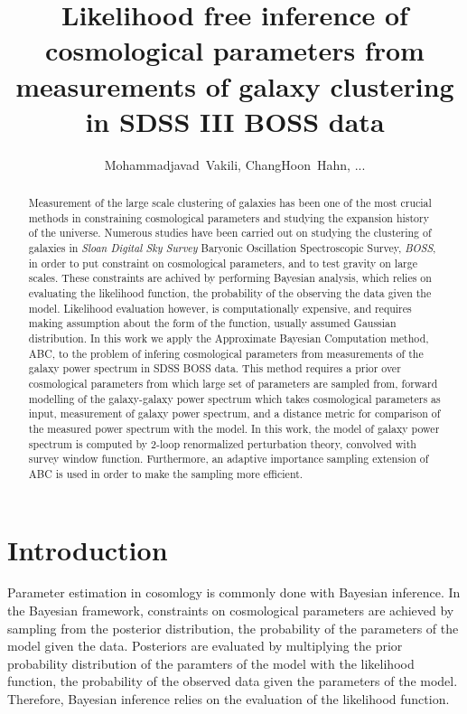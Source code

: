 \documentclass[12pt, preprint]{aastex}
\begin{document}
\author{
  Mohammadjavad~Vakili,
  ChangHoon~Hahn, ...}


\title{Likelihood free inference of cosmological parameters from measurements of galaxy clustering in SDSS III BOSS data}

\begin{abstract}

Measurement of the large scale clustering of galaxies has been 
one of the most crucial methods in constraining cosmological 
parameters and studying the expansion history of the universe.
Numerous studies have been carried out on studying the clustering 
of galaxies in \emph{Sloan Digital Sky Survey} Baryonic Oscillation 
Spectroscopic Survey, \emph{BOSS}, in order to put constraint on 
cosmological parameters, and to test gravity on large scales.
These constraints are achived by performing Bayesian analysis, which 
relies on evaluating the likelihood function, the probability of 
the observing the data given the model. Likelihood evaluation however, 
is computationally expensive, and requires making assumption about the 
form of the function, usually assumed Gaussian distribution. 
In this work we apply the Approximate Bayesian Computation method, ABC, 
to the problem of infering cosmological parameters from measurements of 
the galaxy power spectrum in SDSS BOSS data. This method requires a prior over 
cosmological parameters from which large set of parameters are sampled from, 
forward modelling of the galaxy-galaxy power spectrum which takes cosmological 
parameters as input, measurement of galaxy power spectrum, and a distance metric 
for comparison of the measured power spectrum with the model.
In this work, the model of galaxy power spectrum is computed by 2-loop renormalized 
perturbation theory, convolved with survey window function. Furthermore, an 
adaptive importance sampling extension of ABC is used in order to make the sampling 
more efficient. 

\end{abstract}

\section{Introduction}

Parameter estimation in cosomlogy is commonly done with Bayesian inference. 
In the Bayesian framework, constraints on cosmological parameters are achieved by 
sampling from the posterior distribution, the probability of the parameters of the 
model given the data. Posteriors are evaluated by multiplying the prior probability 
distribution of the paramters of the model with the likelihood function, the probability 
of the observed data given the parameters of the model.
Therefore, Bayesian inference relies on the evaluation of the likelihood function.
 
\end{document}

